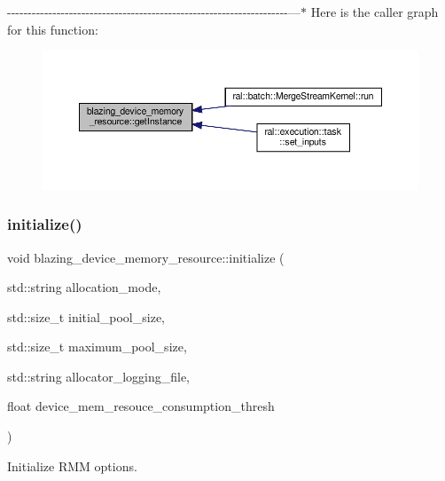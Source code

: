 -\/-\/-\/-\/-\/-\/-\/-\/-\/-\/-\/-\/-\/-\/-\/-\/-\/-\/-\/-\/-\/-\/-\/-\/-\/-\/-\/-\/-\/-\/-\/-\/-\/-\/-\/-\/-\/-\/-\/-\/-\/-\/-\/-\/-\/-\/-\/-\/-\/-\/-\/-\/-\/-\/-\/-\/-\/-\/-\/-\/-\/-\/-\/-\/-\/-\/-\/-\/---$\ast$ Here is the caller graph for this function\+:\nopagebreak
\begin{figure}[H]
\begin{center}
\leavevmode
\includegraphics[width=350pt]{classblazing__device__memory__resource_a31735d61d23aef05666c7c3f981c86fe_icgraph}
\end{center}
\end{figure}
\mbox{\label{classblazing__device__memory__resource_aff09e3f24d6448da5176747dbb37aa6b}} 
\subsubsection{\texorpdfstring{initialize()}{initialize()}}
{\footnotesize\ttfamily void blazing\+\_\+device\+\_\+memory\+\_\+resource\+::initialize (\begin{DoxyParamCaption}\item[{std\+::string}]{allocation\+\_\+mode,  }\item[{std\+::size\+\_\+t}]{initial\+\_\+pool\+\_\+size,  }\item[{std\+::size\+\_\+t}]{maximum\+\_\+pool\+\_\+size,  }\item[{std\+::string}]{allocator\+\_\+logging\+\_\+file,  }\item[{float}]{device\+\_\+mem\+\_\+resouce\+\_\+consumption\+\_\+thresh }\end{DoxyParamCaption})}



Initialize R\+MM options. 

